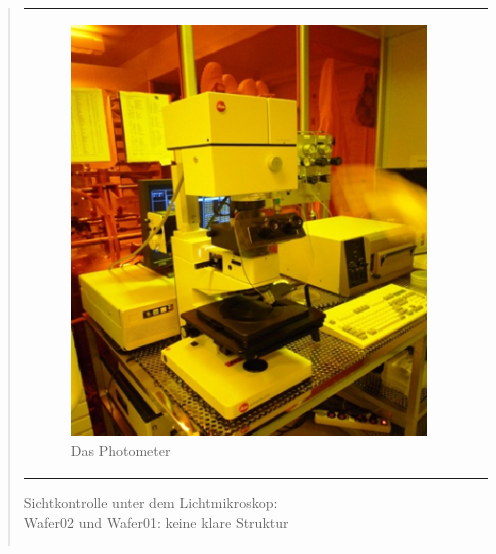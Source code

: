\begin{quote}
\begin{center}
\begin{tabular}{ll}
\begin{minipage}{0.7\textwidth}
                        \begin{figure}[H]
                        \hspace{5em}
                            \includegraphics[scale=0.8, trim = 0cm 0cm 0cm
                            0cm, clip]
                            {./HerstellungBilder/Photometer.png}
                            \caption{Das Photometer}
                           \label{fig:photometer}
                        \end{figure}
                    \vspace{-1.5em}

                    \end{minipage}

                \end{tabular}
			\end{center}

			\vspace{2em}

			Sichtkontrolle unter dem Lichtmikroskop:\\
			Wafer02 und Wafer01: keine klare Struktur

		    \vspace{2em}

    		\begin{center}
                \begin{tabular}{ll}


\end{tabular}
\end{center}
\end{quote}
